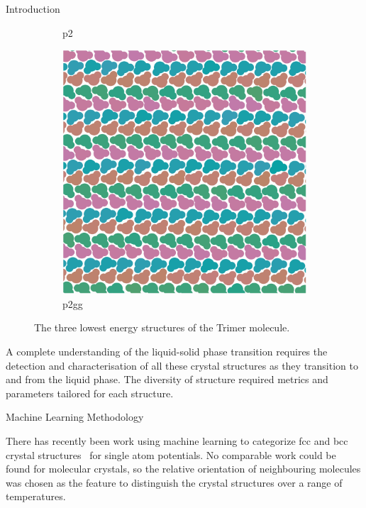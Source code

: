 \documentclass{beamer}
\begin{document}
\begin{frame}[t]{}
\begin{columns}[t]
\begin{column}{0.47\linewidth}
\begin{block}{Introduction}
\begin{figure}[h]
\begin{subfigure}[t]{0.3\linewidth}
            \caption{p2}
            \label{fig:crystals p2}
          \end{subfigure}
          \begin{subfigure}[t]{0.3\linewidth}
              \includegraphics[width=\linewidth]{trimer-crys-p2gg}
            \caption{p2gg}
            \label{fig:crystals p2gg}
          \end{subfigure}
          \caption{The three lowest energy structures of the Trimer molecule.}
          \label{fig:crystals}
        \end{figure}
        A complete understanding of the liquid-solid phase transition requires
        the detection and characterisation of all
        these crystal structures as they transition to and from the liquid phase.
        The diversity of structure required metrics and parameters tailored for each structure.

      \end{block}

    \begin{block}{Machine Learning Methodology}

      There has recently been work using machine learning to
      categorize fcc and bcc crystal structures~\autocite{Reinhart2017,Dietz2017} for single atom
      potentials.
      No comparable work could be found for molecular crystals,
      so the relative orientation of neighbouring molecules was chosen as the feature
      to distinguish the crystal structures over a range of temperatures.


\end{block}
\end{column}
\end{columns}
\end{frame}
\end{document}

